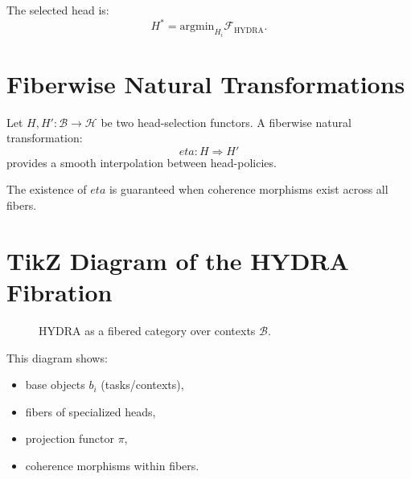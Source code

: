 \documentclass[12pt,oneside]{book}
\theoremstyle{plain}
\theoremstyle{definition}
\def\eta{eta}%
\begin{document}
The selected head is:
\[
H^\ast = \mathrm{argmin}_{H_i} \mathcal{F}_{\mathrm{HYDRA}}.
\]

\section{Fiberwise Natural Transformations}

Let $H, H' : \mathcal{B} \to \mathcal{H}$ be two head-selection functors.
A fiberwise natural transformation:
\[
\eta : H \Rightarrow H'
\]
provides a smooth interpolation between head-policies.

The existence of $\eta$ is guaranteed when coherence morphisms exist across all
fibers.

\section{TikZ Diagram of the HYDRA Fibration}

\begin{figure}[h]
\centering
{}
\caption{HYDRA as a fibered category over contexts $\mathcal{B}$.}
\end{figure}

This diagram shows:

\begin{itemize}
    \item base objects $b_i$ (tasks/contexts),
    \item fibers of specialized heads,
    \item projection functor $\pi$,
    \item coherence morphisms within fibers.
\end{itemize}
\end{document}
